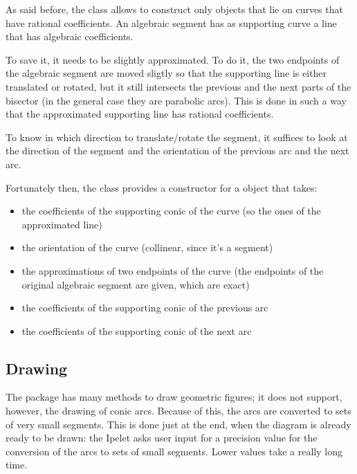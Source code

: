 \documentclass[11pt,a4paper,english]{article}
\begin{document}
	As said before, the class  allows to construct only  objects that lie on curves that have rational coefficients. An algebraic segment has as supporting curve a line that has algebraic coefficients.\par
	To save it, it needs to be slightly approximated. To do it, the two endpoints of the algebraic segment are moved sligtly so that the supporting line  is either translated or rotated, but it still intersects the previous and the next parts of the bisector (in the general case they are parabolic arcs). This is done in such a way that the approximated supporting line has rational coefficients.\par
	To know in which direction to translate/rotate the segment, it suffices to look at the direction of the segment and the orientation of the previous arc and the next arc.\par
	Fortunately then, the  class provides a constructor for a  object that takes:
	\begin{itemize}[label=\(\triangleright\)]\setlength{\itemsep}{-2pt}
		\item the coefficients of the supporting conic of the curve (so the ones of the approximated line)
	\item the orientation of the curve (collinear, since it's a segment)
	\item the approximations of two endpoints of the curve (the endpoints of the original algebraic segment are given, which are exact)
	\item the coefficients of the supporting conic of the previous arc
	\item the coefficients of the supporting conic of the next arc
	\end{itemize}
	
	\subsection{Drawing}
	The  package has many methods to draw geometric figures; it does not support, however, the drawing of conic arcs. Because of this, the arcs are converted to sets of very small segments. This is done just at the end, when the diagram is already ready to be drawn: the Ipelet asks user input for a precision value for the conversion of the arcs to sets of small segments. Lower values take a really long time.
	
\end{document}
